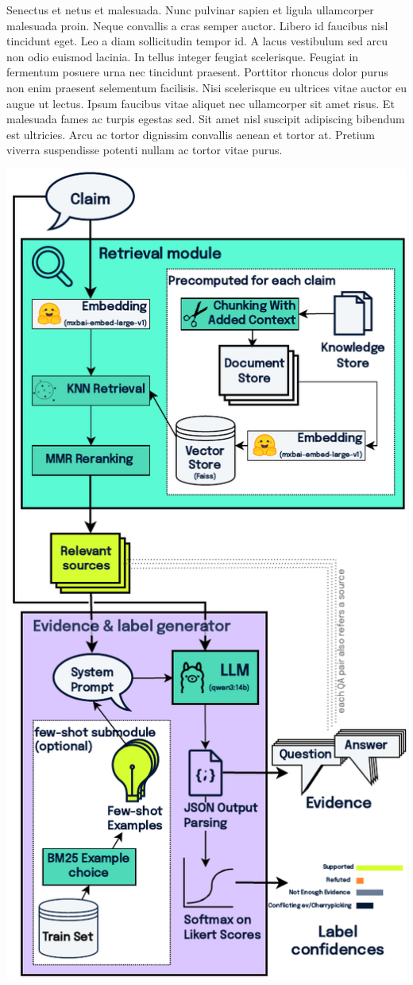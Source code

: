 Senectus et netus et malesuada. Nunc pulvinar sapien et ligula ullamcorper malesuada proin. Neque convallis a cras semper auctor. Libero id faucibus nisl tincidunt eget. Leo a diam sollicitudin tempor id. A lacus vestibulum sed arcu non odio euismod lacinia. In tellus integer feugiat scelerisque. Feugiat in fermentum posuere urna nec tincidunt praesent. Porttitor rhoncus dolor purus non enim praesent selementum facilisis. Nisi scelerisque eu ultrices vitae auctor eu augue ut lectus. Ipsum faucibus vitae aliquet nec ullamcorper sit amet risus. Et malesuada fames ac turpis egestas sed. Sit amet nisl suscipit adipiscing bibendum est ultricies. Arcu ac tortor dignissim convallis aenean et tortor at. Pretium viverra suspendisse potenti nullam ac tortor vitae purus. 
\vspace{-1em}
\begin{minipage}{\linewidth}
    \centering
    \includegraphics[width=\linewidth]{figures/pipeline.pdf}

\end{minipage}
